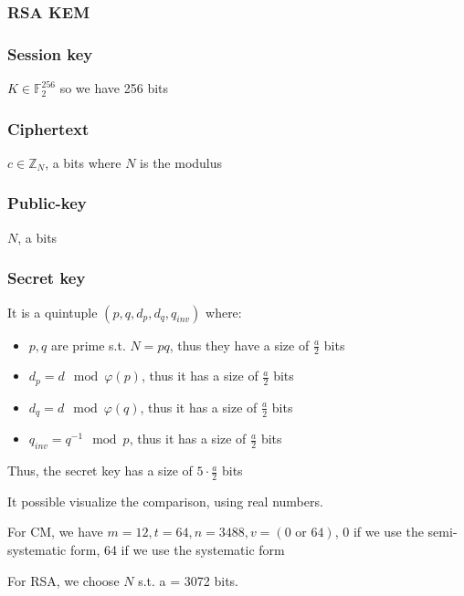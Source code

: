 \subsubsection{RSA KEM}
\subsubsection*{Session key}
$K \in \mathbb{F}_2^{256}$ so we have 256 bits
\subsubsection*{Ciphertext}
$c \in \mathbb{Z}_N$, a bits where $N$ is the modulus
\subsubsection*{Public-key}
$N$, a bits
\subsubsection*{Secret key}
It is a quintuple $(p, q, d_p, d_q, q_{inv})$ where:
\begin{itemize}
    \item $p, q$ are prime s.t. $N = pq$, thus they have a size of $\frac{a}{2}$ bits
    \item $d_p = d \mod \varphi(p)$, thus it has a size of $\frac{a}{2}$ bits
    \item $d_q = d \mod \varphi(q)$, thus it has a size of $\frac{a}{2}$ bits
    \item $q_{inv} = q^{-1} \mod p$, thus it has a size of $\frac{a}{2}$ bits
\end{itemize}
Thus, the secret key has a size of $5 \cdot \frac{a}{2}$ bits

\vspace{1 cm}
\noindent
It possible visualize the comparison, using real numbers.
\newpage

\noindent
For CM, we have $m = 12, t = 64, n = 3488, v = (0 \text{ or } 64)$, 0 if we use the semi-systematic form, 64 if we use the systematic form
\medskip

\noindent
For RSA, we choose $N$ s.t. a = 3072 bits.

